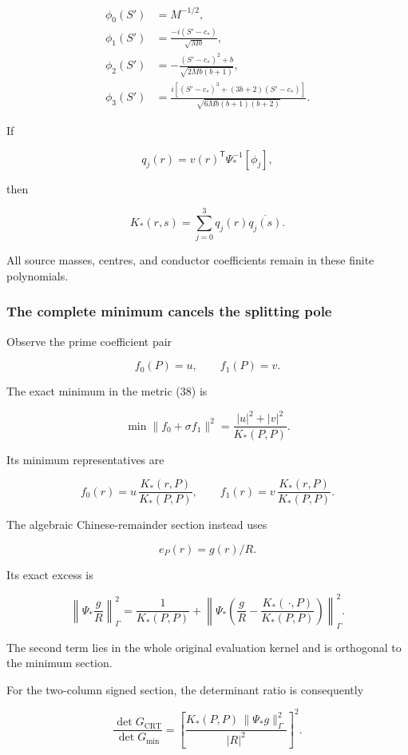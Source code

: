 \[
\begin{aligned}
\phi_0(S')&=M^{-1/2},\\
\phi_1(S')&=\frac{-i(S'-c_*)}{\sqrt{Mb}},\\
\phi_2(S')&=
-\frac{(S'-c_*)^2+b}{\sqrt{2Mb(b+1)}},\\
\phi_3(S')&=
\frac{i[(S'-c_*)^3+(3b+2)(S'-c_*)]}
{\sqrt{6Mb(b+1)(b+2)}}.
\end{aligned}
\]

If

\[
q_j(r)=v(r)^{\mathsf T}\Psi_*^{-1}[\phi_j],
\]

then

\[
\boxed{K_*(r,s)=\sum_{j=0}^3q_j(r)\overline{q_j(s)}.}
\tag{40}
\]

All source masses, centres, and conductor coefficients remain in these
finite polynomials.

\subsubsection{The complete minimum cancels the splitting
pole}\label{the-complete-minimum-cancels-the-splitting-pole}

Observe the prime coefficient pair

\[
f_0(P)=u,\qquad f_1(P)=v.
\]

The exact minimum in the metric (38) is

\[
\boxed{
\min\|f_0+\sigma f_1\|^2
=
\frac{|u|^2+|v|^2}{K_*(P,P)}.
}
\tag{41}
\]

Its minimum representatives are

\[
f_0(r)=u\,\frac{K_*(r,P)}{K_*(P,P)},
\qquad
f_1(r)=v\,\frac{K_*(r,P)}{K_*(P,P)}.
\]

The algebraic Chinese-remainder section instead uses

\[
e_P(r)=g(r)/R.
\]

Its exact excess is

\[
\boxed{
\left\|\Psi_*\frac gR\right\|_\Gamma^2
=
\frac1{K_*(P,P)}
+
\left\|
\Psi_*\left(
\frac gR-\frac{K_*(\,\cdot,P)}{K_*(P,P)}
\right)
\right\|_\Gamma^2.
}
\tag{42}
\]

The second term lies in the whole original evaluation kernel and is
orthogonal to the minimum section.

For the two-column signed section, the determinant ratio is consequently

\[
\boxed{
\frac{\det G_{\mathrm{CRT}}}{\det G_{\min}}
=
\left[
\frac{
K_*(P,P)\,\|\Psi_*g\|_\Gamma^2
}{
|R|^2
}
\right]^2.
}
\tag{43}
\]

